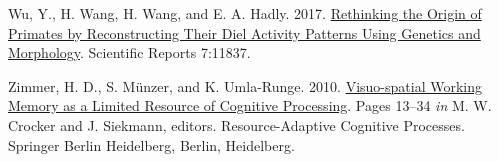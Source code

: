 \documentclass[twoside,12pt,final]{ucthesis-CA2012}
\newenvironment{CSLReferences}%
  {}%
  {\par}
\begin{document}
\begin{ucmainmatter}
\begin{CSLReferences}{1}{0}
\leavevmode{}%
Wu, Y., H. Wang, H. Wang, and E. A. Hadly. 2017. \href{https://doi.org/10.1038/s41598-017-12090-3}{Rethinking the Origin of Primates by Reconstructing Their Diel Activity Patterns Using Genetics and Morphology}. Scientific Reports 7:11837.

\leavevmode{}%
Zimmer, H. D., S. Münzer, and K. Umla-Runge. 2010. \href{https://doi.org/10.1007/978-3-540-89408-7_2}{Visuo-spatial Working Memory as a Limited Resource of Cognitive Processing}. Pages 13--34 \emph{in} M. W. Crocker and J. Siekmann, editors. Resource-Adaptive Cognitive Processes. Springer Berlin Heidelberg, Berlin, Heidelberg.

\end{CSLReferences}
\end{ucmainmatter}
\end{document}

